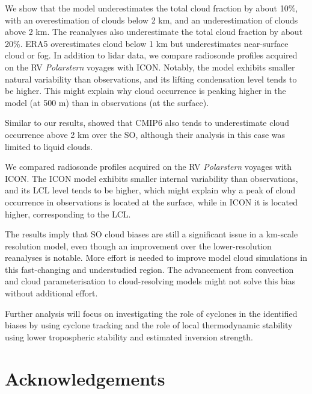 \documentclass[12pt,a4paper]{article}
\begin{document}
We show that the model underestimates the total cloud fraction by about 10\%,
with an overestimation of clouds below 2 km, and an underestimation of clouds
above 2 km. The reanalyses also underestimate the total cloud fraction by about
20\%.  ERA5 overestimates cloud below 1 km but underestimates near-surface
cloud or fog. In addition to lidar data, we compare radiosonde profiles
acquired on the RV \textit{Polarstern} voyages with ICON. Notably, the model
exhibits smaller natural variability than observations, and its lifting
condensation level tends to be higher. This might explain why cloud occurrence
is peaking higher in the model (at 500 m) than in observations (at the
surface).

Similar to our results, \cite{cesana2022} showed that CMIP6 also tends to
underestimate cloud occurrence above 2 km over the SO, although their analysis
in this case was limited to liquid clouds.

We compared radiosonde proﬁles acquired on the RV \emph{Polarstern} voyages
with ICON.  The ICON model exhibits smaller internal variability than
observations, and its LCL level tends to be higher, which might explain why a
peak of cloud occurrence in observations is located at the surface, while in
ICON it is located higher, corresponding to the LCL.

The results imply that SO cloud biases are still a significant issue in a
km-scale resolution model, even though an improvement over the lower-resolution
reanalyses is notable. More effort is needed to improve model cloud simulations
in this fast-changing and understudied region. The advancement from convection
and cloud parameterisation to cloud-resolving models might not solve this bias
without additional effort.

Further analysis will focus on investigating the role of cyclones in the
identified biases by using cyclone tracking and the role of local thermodynamic
stability using lower tropospheric stability and estimated inversion strength.

\section*{Acknowledgements}
\end{document}
